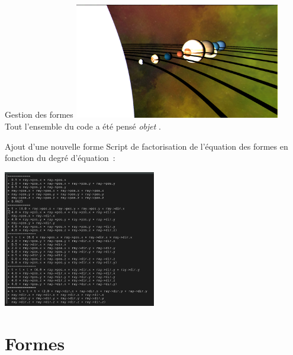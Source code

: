 \documentclass[10pt]{beamer}
\begin{document}
\begin{frame}[fragile]{Gestion des formes}
	\includegraphics[width=9cm]{./imgs/solar.png}
	\pause
	\\
	\bigskip
	Tout l'ensemble du code a été pensé \og \textit{objet} \fg.
\end{frame}

\begin{frame}[fragile]{Ajout d'une nouvelle forme}
	Script de factorisation de l'équation des formes en fonction du degré d'équation~:

	\includegraphics[height=6cm]{./imgs/toto.png}
\end{frame}

\section{Formes}
\end{document}
